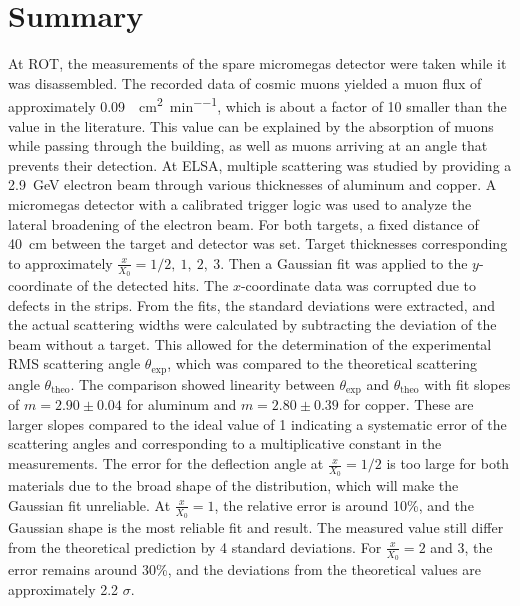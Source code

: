 \documentclass[sn-mathphys-num,iicol]{sn-jnl}
\theoremstyle{thmstyleone}
\theoremstyle{thmstyletwo}
\theoremstyle{thmstylethree}
\begin{document}

\section{Summary}
At ROT, the measurements of the spare micromegas detector were taken while it was disassembled.
The recorded data of cosmic muons yielded a muon flux of approximately \SI{0.09}{\micro\per\centi\meter\squared\per\minute}, which is about a factor of 10 smaller than the value in the literature. 
This value can be explained by the absorption of muons while passing through the building, as well as muons arriving at an angle that prevents their detection.
At ELSA, multiple scattering was studied by providing a \SI{2.9}{GeV} electron beam through various thicknesses of aluminum and copper. 
A micromegas detector with a calibrated trigger logic was used to analyze the lateral broadening of the electron beam. 
For both targets, a fixed distance of \SI{40}{\centi\meter} between the target and detector was set. 
Target thicknesses corresponding to approximately $\tfrac{x}{X_0} = 1/2,\ 1,\ 2,\ 3$. Then a Gaussian fit was applied to the $y$-coordinate of the detected hits. 
The $x$-coordinate data was corrupted due to defects in the strips.
From the fits, the standard deviations were extracted, and the actual scattering widths were calculated by subtracting the deviation of the beam without a target. 
This allowed for the determination of the experimental RMS scattering angle $\theta_{\text{exp}}$, which was compared to the theoretical scattering angle $\theta_{\text{theo}}$.
The comparison showed linearity between $\theta_{\text{exp}}$ and $\theta_{\text{theo}}$ with fit slopes of $m = 2.90 \pm 0.04$ for aluminum and $m = 2.80 \pm 0.39$ for copper. 
These are larger slopes compared to the ideal value of 1 indicating a systematic error of the scattering angles and corresponding to a multiplicative constant in the measurements.
The error for the deflection angle at $\tfrac{x}{X_0}=1/2$ is too large for both materials due to the broad shape of the distribution, which will make the Gaussian fit unreliable. 
At $\tfrac{x}{X_0} = 1$, the relative error is around 10\%, and the Gaussian shape is the most reliable fit and result. 
The measured value still differ from the theoretical prediction by 4 standard deviations. For $\tfrac{x}{X_0} = 2$ and 3, the error remains around 30\%, and the deviations from the theoretical values are approximately 2.2 $\sigma$. 
\end{document}

